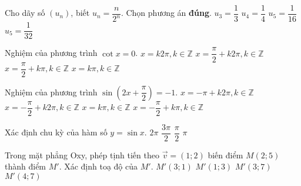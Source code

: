 \begin{ex}%
Cho dãy số $\left(u_n\right)$, biết $u_n  =  \dfrac{n}{2^n}$. Chọn phương án \textbf{đúng}.
\choice
{$u_3  =  \dfrac{1}{3}$}
{\True $u_4  =  \dfrac{1}{4}$}	
{$u_5  =  \dfrac{1}{16}$}	 
{$u_5  =  \dfrac{1}{32}$}

\end{ex}
\begin{ex}%
	Nghiệm của phương trình $\cot x =0$.
	\choice
{$x  =  k2\pi, k\in \mathbb{Z}$}	
{$x  =  \dfrac{\pi}{2}  +  k2\pi, k\in \mathbb{Z}$}
{\True $x  =  \dfrac{\pi}{2}  +  k\pi, k\in \mathbb{Z}$}	
{$x  =  k\pi, k\in \mathbb{Z}$}
\end{ex}
\begin{ex}%
	Nghiệm của phương trình $\sin \left(2x  +  \dfrac{\pi}{2}\right)  =   -  1$.
	\choice
	{$x  =   -  \pi  +  k2\pi, k\in \mathbb{Z}$}	
	{$x  =   -  \dfrac{\pi}{2}  +  k2\pi, k\in \mathbb{Z}$}
	{$x  =  k\pi, k\in \mathbb{Z}$}	
	{\True $x  =   -  \dfrac{\pi}{2}  +  k\pi, k\in \mathbb{Z}$}
\end{ex}
\begin{ex}%
	Xác định chu kỳ của hàm số $y  =  \sin x$.
	\choice
	{\True $2\pi $}	
	{$\dfrac{3\pi}{2}$}
	{$\dfrac{\pi}{2}$}	
	{$\pi $}
\end{ex}
\begin{ex}%
	Trong mặt phẳng Oxy, phép tịnh tiến theo $\vec{v}  =  \left(1;2\right)$ biến điểm $M\left(2;5\right)$ thành điểm $M'$. Xác định toạ độ của $M'$.
	\choice
	{$M'\left(3;1\right)$}	
	{$M'\left(1;3\right)$}	
	{\True $M'\left(3;7\right)$}
	{$M'\left(4;7\right)$}
\end{ex}
